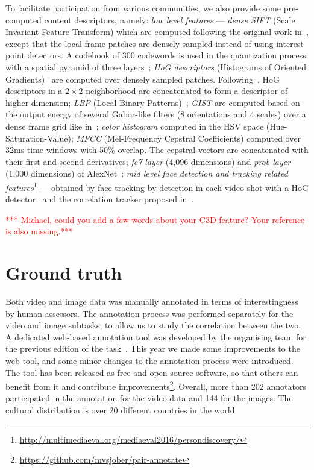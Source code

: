 \documentclass[sigconf]{acmart-me}
\begin{document}
To facilitate participation from various communities, we also
provide some pre-computed content descriptors, namely: \emph{low
level features} --- \emph{dense SIFT} (Scale Invariant Feature
Transform) which are computed following the original work
in~\cite{Lowe2004}, except that the local frame patches are densely
sampled instead of using interest point detectors. A codebook of 300
codewords is used in the quantization process with a spatial pyramid
of three layers~\cite{Lazebnik2006}; \emph{HoG descriptors}
(Histograms of Oriented Gradients)~\cite{Dalal2005} are computed
over densely sampled patches. Following~\cite{Xiao2010}, HoG
descriptors in a $2\times2$ neighborhood are concatenated to form a
descriptor of higher dimension; \emph{LBP} (Local Binary
Patterns)~\cite{Ojala2002}; \emph{GIST} are computed based on the
output energy of several Gabor-like filters (8 orientations and 4
scales) over a dense frame grid like in~\cite{Oliva2001};
\emph{color histogram} computed in the HSV space
(Hue-Saturation-Value); \emph{MFCC} (Mel-Frequency Cepstral
Coefficients) computed over 32ms time-windows with 50\%
overlap. The cepstral vectors are concatenated with their first and
second derivatives; \emph{fc7 layer} (4,096 dimensions) and
\emph{prob layer} (1,000 dimensions) of AlexNet~\cite{Jiang2015};
\emph{mid level face detection and tracking related
features}\footnote{\url{http://multimediaeval.org/mediaeval2016/persondiscovery/}}
--- obtained by face tracking-by-detection in each video shot with a
HoG detector~\cite{Dalal2005} and the correlation tracker proposed
in~\cite{Danelljan2014}.

\textcolor{red}{*** Michael, could you add a few words about your C3D feature? Your reference is also missing.***}


\section{Ground truth}

Both video and image data was manually annotated in terms of interestingness by human assessors.
The annotation process was performed separately for the video and image subtasks, to allow us to study the correlation between the two.
A dedicated web-based annotation tool was developed by the organising team for the previous edition of the task~\cite{demarty2016mediaeval}.
This year we made some improvements to the web tool, and some minor changes to the annotation process were introduced.
The tool has been released as free and open source software, so that others can benefit from it and contribute
improvements\footnote{\url{https://github.com/mvsjober/pair-annotate}}.
Overall, more than 202 annotators participated in the annotation for the video data and 144 for the images.
The cultural distribution is over 20 different countries in the world.
\end{document}

